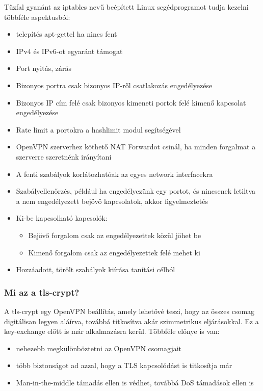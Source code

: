 Tűzfal gyanánt az iptables nevű beépített Linux segédprogramot tudja kezelni többféle aspektusból:
\begin{itemize}
	\item telepítés apt-gettel ha nincs fent
	\item IPv4 és IPv6-ot egyaránt támogat
	\item Port nyitás, zárás
	\item Bizonyos portra csak bizonyos IP-ről csatlakozás engedélyezése
	\item Bizonyos IP cím felé csak bizonyos kimeneti portok felé kimenő kapcsolat engedélyezése
	\item Rate limit a portokra a hashlimit modul segítségével
	\item OpenVPN szerverhez köthető NAT Forwardot csinál, ha minden forgalmat a szerverre szeretnénk irányítani
	\item A fenti szabályok korlátozhatóak az egyes network interfacekra
	\item Szabályellenőrzés, például ha engedélyezünk egy portot, és nincsenek letiltva a nem engedélyezett bejövő kapcsolatok, akkor figyelmeztetés
	\item Ki-be kapcsolható kapcsolók:
		\begin{itemize}
			\item Bejövő forgalom csak az engedélyezettek közül jöhet be
			\item Kimenő forgalom csak az engedélyezettek felé mehet ki
		\end{itemize}
	\item Hozzáadott, törölt szabályok kiírása tanítási célból
\end{itemize}

\subsubsection{Mi az a tls-crypt?} \label{ref:tls-crypt}
A tls-crypt egy OpenVPN beállítás, amely lehetővé teszi, hogy az összes csomag digitálisan legyen aláírva, továbbá titkosítva akár szimmetrikus eljárásokkal. Ez a key-exchange előtt is már alkalmazásra kerül. \cite{openvpnmanual}
Többféle előnye is van:
\begin{itemize}
	\item nehezebb megkülönböztetni az OpenVPN csomagjait
	\item több biztonságot ad azzal, hogy a TLS kapcsolódást is titkosítja már
	\item Man-in-the-middle támadás ellen is védhet, továbbá DoS támadások ellen is
\end{itemize}

